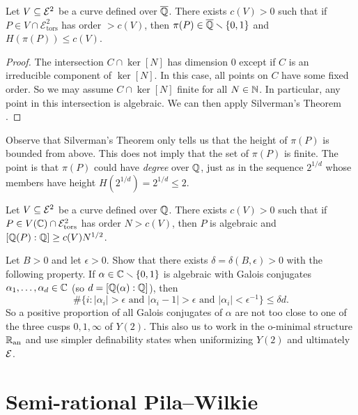 \begin{theorem}
  Let $V\subseteq {\mathcal E}^2$ be a curve defined over ${\overline{\mathbb{Q}}}$. There exists 
  $c(V)>0$ such that if $P\in V\cap\mathcal{E}^2_{\mathrm{tors}}$  has
  order $>c(V)$, then $\pi(P)\in {\overline{\mathbb{Q}}}\smallsetminus\{0,1\}$ and $H(\pi(P))\le c(V)$. 
\end{theorem}
\begin{proof}
  The intersection $C\cap \ker[N]$ has dimension $0$ except if $C$ is
  an irreducible component of $\ker[N]$. In this case, all points on
  $C$ have some fixed order. So we may assume $C\cap \ker[N]$ finite
  for all $N\in{\mathbb{N}}$. In particular, any point in this intersection is
  algebraic. We can then apply Silverman's Theorem \cite{Silverman}. 
\end{proof}

Observe that Silverman's Theorem only tells us that the height of
$\pi(P)$ is bounded from above. This does not imply that the set of
$\pi(P)$ is finite. The point is that  $\pi(P)$ could have
\textit{degree} over ${\mathbb{Q}}$,
just as in the sequence $2^{1/d}$ whose members have height
$H(2^{1/d})=2^{1/d}\le 2$. 


\begin{corollary}
  \label{cor:davidsilverman}
  Let $V\subseteq {\mathcal E}^2$ be a curve defined over ${\mathbb{Q}}$. There exists 
  $c(V)>0$ such that if $P\in V({\mathbb{C}})\cap\mathcal{E}^2_{\mathrm{tors}}$  has
  order $N>c(V)$, then $P$ is algebraic and 
  $[{\mathbb{Q}}(P):{\mathbb{Q}}] \ge c(V) N^{1/2}$. 
\end{corollary}

\begin{exercise}
  Let $B>0$ and  let $\epsilon > 0$. Show that there exists
  $\delta =\delta(B,\epsilon)>0$ with the following property. If
  $\alpha\in{\mathbb{C}}\smallsetminus\{0,1\}$ is algebraic with Galois conjugates
  $\alpha_1,\ldots,\alpha_d\in{\mathbb{C}}$ (so $d=[{\mathbb{Q}}(\alpha):{\mathbb{Q}}]$), then 
  \begin{equation*}
    \#\{ i : |\alpha_i|> \epsilon \text{ and
    }|\alpha_i-1|>\epsilon\text{ and }|\alpha_i|<\epsilon^{-1}\} \le
    \delta d.
  \end{equation*}
  So a positive proportion of all Galois conjugates of $\alpha$ are
  not too close to one of the three cusps $0,1,\infty$ of $Y(2)$. This
  also us to work in the o-minimal structure ${{\mathbb{R}}_{\mathrm{an}}}$ and use simpler
  definability states when uniformizing $Y(2)$ and ultimately ${\mathcal E}$. 
\end{exercise}

\section{Semi-rational Pila--Wilkie}
\label{sec:semirational}

